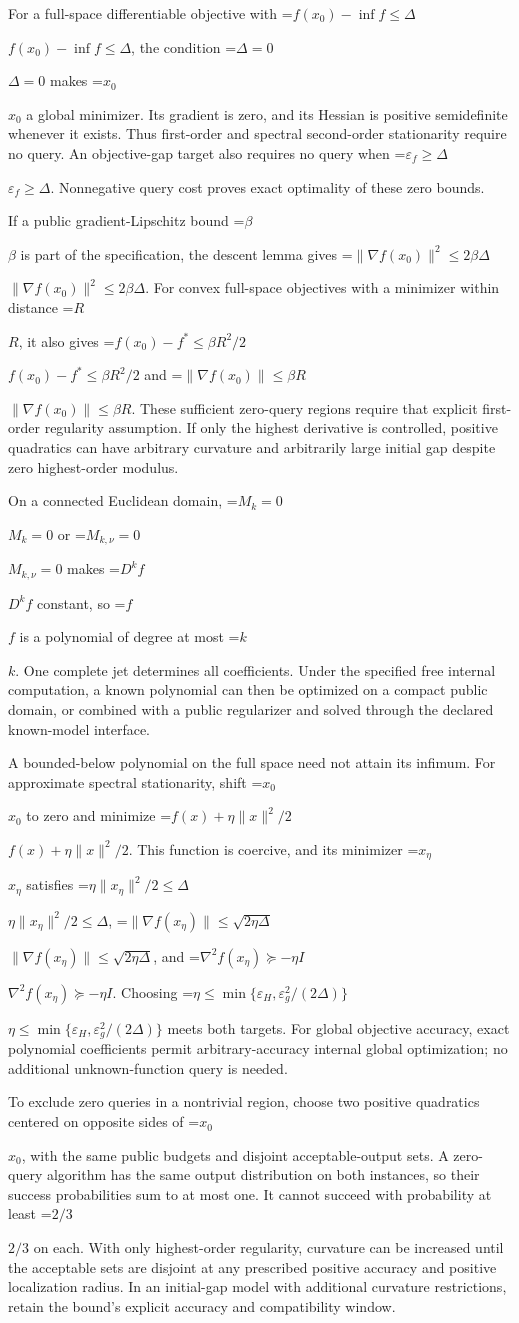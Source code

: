 \documentclass[10pt,a4paper]{article}
\newcommand{\AtlasMath}[1]{\par\begingroup\centering\setbox0=\hbox{$\displaystyle #1$}\ifdim\wd0>1.4\linewidth\typeout{ATLAS WIDE FORMULA: \the\wd0}\fi\ifdim\wd0>\linewidth\resizebox{\linewidth}{!}{\box0}\else\box0\fi\par\endgroup}
\newcommand{\AtlasInlineMath}[1]{\begingroup\setbox0=\hbox{$#1$}\ifdim\wd0>.4\linewidth\endgroup\AtlasMath{#1}\else\endgroup$#1$\fi}
\begin{document}
For a full-space differentiable objective with \AtlasInlineMath{f(x_0)-\inf f\le\Delta}, the condition \AtlasInlineMath{\Delta=0} makes \AtlasInlineMath{x_0} a global minimizer. Its gradient is zero, and its Hessian is positive semidefinite whenever it exists. Thus first-order and spectral second-order stationarity require no query. An objective-gap target also requires no query when \AtlasInlineMath{\varepsilon_f\ge\Delta}. Nonnegative query cost proves exact optimality of these zero bounds.

If a public gradient-Lipschitz bound \AtlasInlineMath{\beta} is part of the specification, the descent lemma gives \AtlasInlineMath{\|\nabla f(x_0)\|^2\le2\beta\Delta}. For convex full-space objectives with a minimizer within distance \AtlasInlineMath{R}, it also gives \AtlasInlineMath{f(x_0)-f^*\le\beta R^2/2} and \AtlasInlineMath{\|\nabla f(x_0)\|\le\beta R}. These sufficient zero-query regions require that explicit first-order regularity assumption. If only the highest derivative is controlled, positive quadratics can have arbitrary curvature and arbitrarily large initial gap despite zero highest-order modulus.

On a connected Euclidean domain, \AtlasInlineMath{M_k=0} or \AtlasInlineMath{M_{k,\nu}=0} makes \AtlasInlineMath{D^kf} constant, so \AtlasInlineMath{f} is a polynomial of degree at most \AtlasInlineMath{k}. One complete jet determines all coefficients. Under the specified free internal computation, a known polynomial can then be optimized on a compact public domain, or combined with a public regularizer and solved through the declared known-model interface.

A bounded-below polynomial on the full space need not attain its infimum. For approximate spectral stationarity, shift \AtlasInlineMath{x_0} to zero and minimize \AtlasInlineMath{f(x)+\eta\|x\|^2/2}. This function is coercive, and its minimizer \AtlasInlineMath{x_\eta} satisfies \AtlasInlineMath{\eta\|x_\eta\|^2/2\le\Delta}, \AtlasInlineMath{\|\nabla f(x_\eta)\|\le\sqrt{2\eta\Delta}}, and \AtlasInlineMath{\nabla^2f(x_\eta)\succeq-\eta I}. Choosing \AtlasInlineMath{\eta\le\min\{\varepsilon_H,\varepsilon_g^2/(2\Delta)\}} meets both targets. For global objective accuracy, exact polynomial coefficients permit arbitrary-accuracy internal global optimization; no additional unknown-function query is needed.

To exclude zero queries in a nontrivial region, choose two positive quadratics centered on opposite sides of \AtlasInlineMath{x_0}, with the same public budgets and disjoint acceptable-output sets. A zero-query algorithm has the same output distribution on both instances, so their success probabilities sum to at most one. It cannot succeed with probability at least \AtlasInlineMath{2/3} on each. With only highest-order regularity, curvature can be increased until the acceptable sets are disjoint at any prescribed positive accuracy and positive localization radius. In an initial-gap model with additional curvature restrictions, retain the bound's explicit accuracy and compatibility window.
\end{document}
